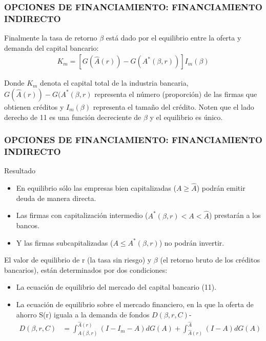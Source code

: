 \documentclass[10pt, xcolor=table, x11names]{beamer}
\begin{document}
\begin{frame}
    \frametitle{{\normalsize OPCIONES DE FINANCIAMIENTO: FINANCIAMIENTO INDIRECTO} {}}
    Finalmente la tasa de retorno $\beta$ está dado por el equilibrio entre la oferta y demanda del capital bancario:
    \begin{align}
    K_{m}=\left[G(\hat{A}(r))-G(A^{*}(\beta, r)) \right] I_{m}(\beta)
    \end{align}
    
    Donde $K_{m}$ denota el capital total de la industria bancaria, $G(\hat{A}(r))-G(A^{*}(\beta, r)$ representa el número (proporción) de las firmas que obtienen créditos y $I_{m}(\beta)$ representa el tamaño del crédito. Noten que el lado derecho de 11 es una función decreciente de $\beta$ y el equilibrio es único. 
\end{frame}

\begin{frame}
    \frametitle{{\normalsize OPCIONES DE FINANCIAMIENTO: FINANCIAMIENTO INDIRECTO} {}}
    \begin{block} {Resultado}
        \begin{itemize}
            \item  En equilibrio sólo las empresas bien capitalizadas ($A\geq \hat{A} $) podrán emitir deuda de manera directa.
            \item  Las firmas con capitalización intermedio ($A^{*}(\beta, r) < A < \hat{A} $) prestarán a los bancos.
            \item Y las firmas subcapitalizadas ($ A \leq A^{*}(\beta, r) $)  no podrán invertir.
        \end{itemize}
      \end{block}
  
   El valor de equilibrio de r (la tasa sin riesgo) y $\beta $ (el retorno bruto de los créditos bancarios), están determinados por dos condiciones:
  \begin{itemize}
      \item La ecuación de equilibrio del mercado del capital bancario (11).
      \item La ecuación de equilibrio sobre el mercado financiero, en la que la oferta de ahorro S(r) iguala a la demanda de fondos $D(\beta, r, C)$-
    \begin{align}
   D(\beta, r, C)&=\int_{A(\beta, r)}^{\hat{A}(r)}(I-I_{m}-A)dG(A)+\int_{\hat{A}(r)}^{\hat{A}}(I-A)dG(A)
   \end{align}   
      
  \end{itemize}

\end{frame}
\end{document}
